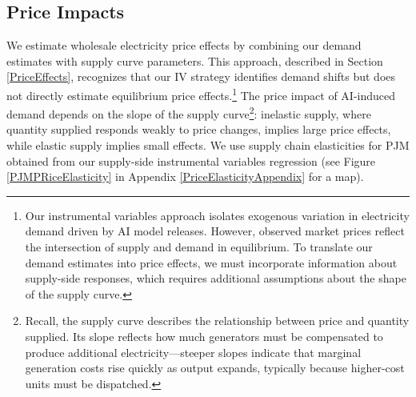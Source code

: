 \documentclass[a4paper,fleqn,longmktitle]{cas-sc}
\newcommand{\nb}[1]{\textcolor{blue}{NB[#1]}}
\theoremstyle{plain}
\theoremstyle{definition}
\begin{document}
\subsection{Price Impacts}
\label{subsec:price-effects-results}

We estimate wholesale electricity price effects by combining our demand estimates with supply curve parameters. This approach, described in Section \ref{PriceEffects}, recognizes that our IV strategy identifies demand shifts but does not directly estimate equilibrium price effects.\footnote{Our instrumental variables approach isolates exogenous variation in electricity demand driven by AI model releases. However, observed market prices reflect the intersection of supply and demand in equilibrium. To translate our demand estimates into price effects, we must incorporate information about supply-side responses, which requires additional assumptions about the shape of the supply curve.} The price impact of AI-induced demand depends on the slope of the supply curve\footnote{Recall, the supply curve describes the relationship between price and quantity supplied. Its slope reflects how much generators must be compensated to produce additional electricity—steeper slopes indicate that marginal generation costs rise quickly as output expands, typically because higher-cost units must be dispatched.}: inelastic supply, where quantity supplied responds weakly to price changes, implies large price effects, while elastic supply implies small effects. We use supply chain elasticities for PJM obtained from our supply-side instrumental variables regression (see Figure \ref{PJMPRiceElasticity} in Appendix \ref{PriceElasticityAppendix} for a map). 
\end{document}
